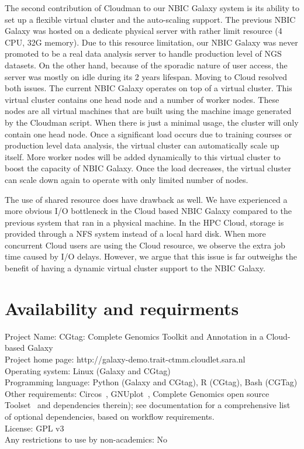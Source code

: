 \documentclass[10pt]{bmc_article}
\newenvironment{bmcformat}{\begin{raggedright}\baselineskip20pt\sloppy\setboolean{publ}{false}}{\end{raggedright}\baselineskip20pt\sloppy}
\begin{document}
\begin{bmcformat}
The second contribution of Cloudman to our NBIC Galaxy system is its ability to set up a flexible virtual cluster and the auto-scaling support. The previous NBIC Galaxy was hosted on a dedicate physical server with rather limit resource (4 CPU, 32G memory). Due to this resource limitation, our NBIC Galaxy was never promoted to be a real data analysis server to handle production level of NGS datasets. On the other hand, because of the sporadic nature of user access, the server was mostly on idle during its 2 years lifespan. Moving to Cloud resolved both issues. The current NBIC Galaxy operates on top of a virtual cluster. This virtual cluster contains one head node and a number of worker nodes. These nodes are all virtual machines that are built using the machine image generated by the Cloudman script. When there is just a minimal usage, the cluster will only contain one head node. Once a significant load occurs due to training courses or production level data analysis, the virtual cluster can automatically scale up itself. More worker nodes will be added dynamically to this virtual cluster to boost the capacity of NBIC Galaxy. Once the load decreases, the virtual cluster can scale down again to operate with only limited number of nodes.

The use of shared resource does have drawback as well. We have experienced a more obvious I/O bottleneck in the Cloud based NBIC Galaxy compared to the previous system that ran in a physical machine. In the HPC Cloud, storage is provided through a NFS system instead of a local hard disk. When more concurrent Cloud users are using the Cloud resource, we observe the extra job time caused by I/O delays. However, we argue that this issue is far outweighs the benefit of having a dynamic virtual cluster support to the NBIC Galaxy.
    
\section*{Availability and requirments}
Project Name: CGtag: Complete Genomics Toolkit and Annotation in a Cloud-based Galaxy\\
Project home page: http://galaxy-demo.trait-ctmm.cloudlet.sara.nl\\
Operating system: Linux (Galaxy and CGtag)\\
Programming language: Python (Galaxy and CGtag), R (CGtag), Bash (CGTag) \\
Other requirements: Circos~\cite{url-circos}, GNUplot~\cite{url-gnuplot}, Complete Genomics open source Toolset~\cite{url-cgatools}  and dependencies therein);  see documentation for a comprehensive list of optional dependencies, based on workflow requirements.\\
License: GPL v3\\
Any restrictions to use by non-academics: No\\



\end{bmcformat}
\end{document}
